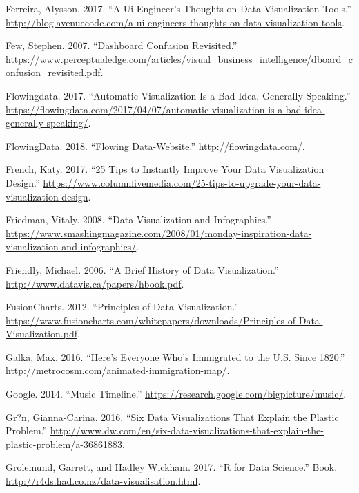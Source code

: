 \documentclass[]{book}
\begin{document}
\leavevmode\hypertarget{ref-UI_engineer}{}%
Ferreira, Alysson. 2017. ``A Ui Engineer's Thoughts on Data Visualization Tools.'' \url{http://blog.avenuecode.com/a-ui-engineers-thoughts-on-data-visualization-tools}.

\leavevmode\hypertarget{ref-dashboard}{}%
Few, Stephen. 2007. ``Dashboard Confusion Revisited.'' \url{https://www.perceptualedge.com/articles/visual_business_intelligence/dboard_confusion_revisited.pdf}.

\leavevmode\hypertarget{ref-auto_viz}{}%
Flowingdata. 2017. ``Automatic Visualization Is a Bad Idea, Generally Speaking.'' \url{https://flowingdata.com/2017/04/07/automatic-visualization-is-a-bad-idea-generally-speaking/}.

\leavevmode\hypertarget{ref-flowingdata}{}%
FlowingData. 2018. ``Flowing Data-Website.'' \url{http://flowingdata.com/}.

\leavevmode\hypertarget{ref-French}{}%
French, Katy. 2017. ``25 Tips to Instantly Improve Your Data Visualization Design.'' \url{https://www.columnfivemedia.com/25-tips-to-upgrade-your-data-visualization-design}.

\leavevmode\hypertarget{ref-viz}{}%
Friedman, Vitaly. 2008. ``Data-Visualization-and-Infographics.'' \url{https://www.smashingmagazine.com/2008/01/monday-inspiration-data-visualization-and-infographics/}.

\leavevmode\hypertarget{ref-data_viz_history}{}%
Friendly, Michael. 2006. ``A Brief History of Data Visualization.'' \url{http://www.datavis.ca/papers/hbook.pdf}.

\leavevmode\hypertarget{ref-principles-fusioncharts}{}%
FusionCharts. 2012. ``Principles of Data Visualization.'' \url{https://www.fusioncharts.com/whitepapers/downloads/Principles-of-Data-Visualization.pdf}.

\leavevmode\hypertarget{ref-immigration}{}%
Galka, Max. 2016. ``Here's Everyone Who's Immigrated to the U.S. Since 1820.'' \url{http://metrocosm.com/animated-immigration-map/}.

\leavevmode\hypertarget{ref-google_music}{}%
Google. 2014. ``Music Timeline.'' \url{https://research.google.com/bigpicture/music/}.

\leavevmode\hypertarget{ref-plastic_pollution_visualizations}{}%
Gr?n, Gianna-Carina. 2016. ``Six Data Visualizations That Explain the Plastic Problem.'' \url{http://www.dw.com/en/six-data-visualizations-that-explain-the-plastic-problem/a-36861883}.

\leavevmode\hypertarget{ref-Grammar_Graphics}{}%
Grolemund, Garrett, and Hadley Wickham. 2017. ``R for Data Science.'' Book. \url{http://r4ds.had.co.nz/data-visualisation.html}.
\end{document}
